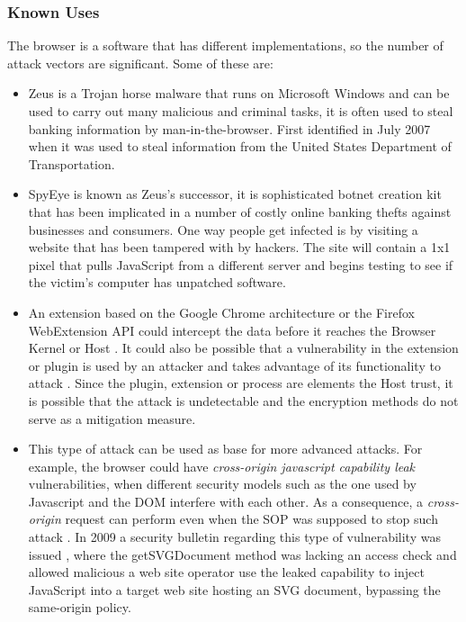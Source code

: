 \documentclass{sig-alternate-05-2015}
\begin{document}
  \subsubsection*{Known Uses} The browser is a software that has different implementations, so the number of attack vectors are significant. Some of these are:
      \begin{itemize}
        \item Zeus \cite{zeus} is a Trojan horse malware that runs on Microsoft Windows and can be used to carry out many malicious and criminal tasks, it is often used to steal banking information by man-in-the-browser. First identified in July 2007 when it was used to steal information from the United States Department of Transportation.
        \item SpyEye \cite{spyeye1} is known as Zeus's successor, it is sophisticated botnet creation kit that has been implicated in a number of costly online banking thefts against businesses and consumers. One way people get infected is by visiting a website that has been tampered with by hackers. The site will contain a 1x1 pixel that pulls JavaScript from a different server and begins testing to see if the victim's computer has unpatched software.
        \item An extension based on the Google Chrome architecture or the Firefox WebExtension API could intercept the data before it reaches the Browser Kernel or Host \cite{Paola2006}. It could also be possible that a vulnerability in the extension or plugin is used by an attacker and takes advantage of its functionality to attack \cite{Liu2012,Barth2010}. Since the plugin, extension or process are elements the Host trust, it is possible that the attack is undetectable and the encryption methods do not serve as a mitigation measure.
        \item This type of attack can be used as base for more advanced attacks. For example, the browser could have \textit{cross-origin javascript capability leak} vulnerabilities, when different security models such as the one used by Javascript and the DOM interfere with each other. As a consequence, a \textit{cross-origin} request can perform even when the SOP was supposed to stop such attack \cite{Barth2009}. In 2009 a security bulletin regarding this type of vulnerability was issued \cite{javacapab}, where the getSVGDocument method was lacking an access check and allowed malicious a web site operator use the leaked capability to inject JavaScript into a target web site hosting an SVG document, bypassing the same-origin policy.
      \end{itemize}
\end{document}
